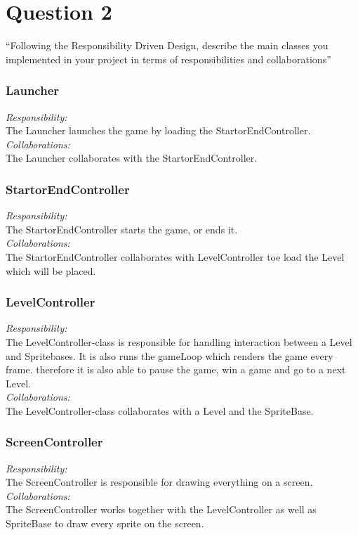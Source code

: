 \section{Question 2}

``Following the Responsibility Driven Design, describe the main classes you implemented in your project in terms of responsibilities and collaborations''

\subsubsection{Launcher}
\textit{Responsibility:} \\
The Launcher launches the game by loading the StartorEndController. \\
\textit{Collaborations:} \\
The Launcher collaborates with the StartorEndController. 

\subsubsection{StartorEndController}
\textit{Responsibility:} \\
The StartorEndController starts the game, or ends it. \\
\textit{Collaborations:} \\
The StartorEndController collaborates with LevelController toe load the Level which will be placed. 

\subsubsection{LevelController}
\textit{Responsibility:} \\
The LevelController-class is responsible for handling interaction between a Level and Spritebases. It is also runs the gameLoop which renders the game every frame. therefore it is also able to pause the game, win a game and go to a next Level. \\
\textit{Collaborations:} \\
The LevelController-class collaborates with a Level and the SpriteBase.

\subsubsection{ScreenController}
\textit{Responsibility:} \\
The ScreenController is responsible for drawing everything on a screen. \\
\textit{Collaborations:} \\
The ScreenController works together with the LevelController as well as SpriteBase to draw every sprite on the screen. 

